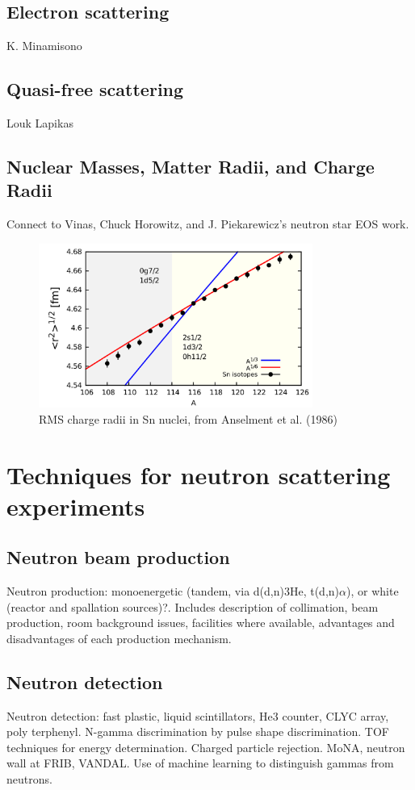 \subsection{Electron scattering}
K. Minamisono


\subsection{Quasi-free scattering}
Louk Lapikas

\subsection{Nuclear Masses, Matter Radii, and Charge Radii}
Connect to Vinas, Chuck Horowitz, and J. Piekarewicz's neutron star EOS work.

\begin{figure}
    \includegraphics[width=0.8\textwidth]{figures/SnIsotopeRMSRadii.png}
    \caption{RMS charge radii in Sn nuclei, from Anselment et al. (1986)}
    \label{SnIsotopeShift}
\end{figure}

\section{Techniques for neutron scattering experiments}
\subsection{Neutron beam production}
Neutron production: monoenergetic (tandem, via d(d,n)3He, t(d,n)$\alpha$),
or white (reactor and spallation sources)?. Includes description of
collimation, beam production, room background issues, facilities where
available, advantages and disadvantages of each production mechanism.

\subsection{Neutron detection}
Neutron detection: fast plastic, liquid scintillators, He3 counter, CLYC array, poly
terphenyl. N-gamma discrimination by pulse shape discrimination. TOF techniques
for energy determination. Charged particle rejection. MoNA, neutron wall at
FRIB, VANDAL. Use of machine learning to distinguish gammas from neutrons.

